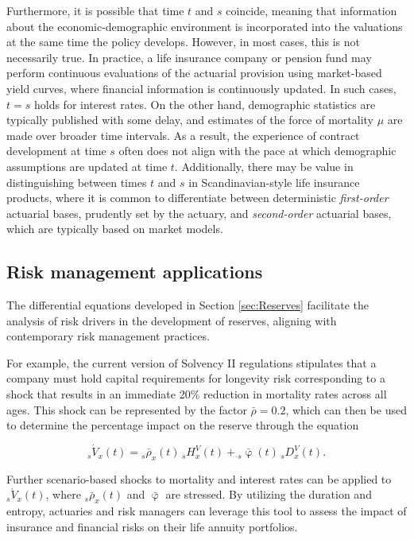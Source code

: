 \documentclass[12pt]{article}
\begin{document}
{Furthermore, it is possible that time \( t \) and \( s \) coincide, meaning that information about the economic-demographic environment is incorporated into the valuations at the same time the policy develops. However, in most cases, this is not necessarily true. In practice, a life insurance company or pension fund may perform continuous evaluations of the actuarial provision using market-based yield curves, where financial information is continuously updated. In such cases, \( t = s \) holds for interest rates. On the other hand, demographic statistics are typically published with some delay, and estimates of the force of mortality \( \mu \) are made over broader time intervals. As a result, the experience of contract development at time \( s \) often does not align with the pace at which demographic assumptions are updated at time \( t \). Additionally, there may be value in distinguishing between times \( t \) and \( s \) in Scandinavian-style life insurance products, where it is common to differentiate between deterministic \textit{first-order} actuarial bases, prudently set by the actuary, and \textit{second-order} actuarial bases, which are typically based on market models.


\subsection{Risk management applications}

The differential equations developed in Section \ref{sec:Reserves} facilitate the analysis of risk drivers in the development of reserves, aligning with contemporary risk management practices.

For example, the current version of Solvency II regulations stipulates that a company must hold capital requirements for longevity risk corresponding to a shock that results in an immediate 20\% reduction in mortality rates across all ages. This shock can be represented by the factor \( \bar{\rho} = 0.2 \), which can then be used to determine the percentage impact on the reserve through the equation 

\[
{}_s\acute{V}_x(t) = {}_s\bar{\rho}_x(t) \, {}_sH_x^V(t) + {}_s\bar{\upvarphi}(t) \, {}_sD_x^V(t).
\]

Further scenario-based shocks to mortality and interest rates can be applied to \( {}_s\acute{V}_x(t) \), where \( {}_s\bar{\rho}_x(t) \) and \( \bar{\upvarphi} \) are stressed. By utilizing the duration and entropy, actuaries and risk managers can leverage this tool to assess the impact of insurance and financial risks on their life annuity portfolios.

}
\end{document}
